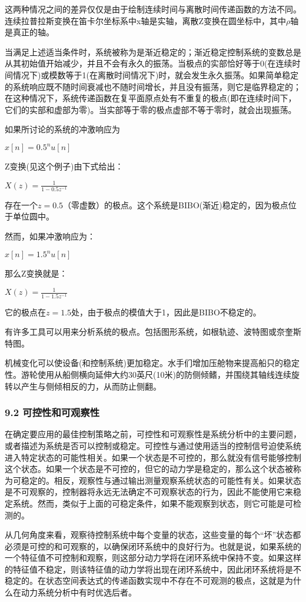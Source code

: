 这两种情况之间的差异仅仅是由于绘制连续时间与离散时间传递函数的方法不同。连续拉普拉斯变换在笛卡尔坐标系中x轴是实轴，离散Z变换在圆坐标中，其中$\rho
$轴是真正的轴。

当满足上述适当条件时，系统被称为是渐近稳定的；渐近稳定控制系统的变数总是从其初始值开始减少，并且不会有永久的振荡。当极点的实部恰好等于0(在连续时间情况下)或模数等于1(在离散时间情况下)时，就会发生永久振荡。如果简单稳定的系统响应既不随时间衰减也不随时间增长，并且没有振荡，则它是临界稳定的；在这种情况下，系统传递函数在复平面原点处有不重复的极点(即在连续时间下，它们的实部和虚部为零)。当实部等于零的极点虚部不等于零时，就会出现振荡。

如果所讨论的系统的冲激响应为

$x[n] = 0.5^n u[n]$

Z变换(见这个例子)由下式给出：

$X(z) = \frac{1}{1 - 0.5z^{-1}}$

存在一个$z = 0.5$（零虚数）的极点。这个系统是BIBO(渐近)稳定的，因为极点位于单位圆中。

然而，如果冲激响应为：

$x[n] = 1.5^n u[n]$

那么Z变换就是：

$ X(z) = \frac{1}{1 - 1.5z^{-1}} $

它的极点在$z = 1.5$处，由于极点的模值大于1，因此是BIBO不稳定的。

有许多工具可以用来分析系统的极点。包括图形系统，如根轨迹、波特图或奈奎斯特图。

机械变化可以使设备(和控制系统)更加稳定。水手们增加压舱物来提高船只的稳定性。游轮使用从船侧横向延伸大约30英尺(10米)的防侧倾鳍，并围绕其轴线连续旋转以产生与侧倾相反的力，从而防止侧翻。

\subsubsection{9.2 可控性和可观察性}

在确定要应用的最佳控制策略之前，可控性和可观察性是系统分析中的主要问题，或者描述为系统是否可以控制或稳定。可控性与通过使用适当的控制信号迫使系统进入特定状态的可能性相关。如果一个状态是不可控的，那么就没有信号能够控制这个状态。如果一个状态是不可控的，但它的动力学是稳定的，那么这个状态被称为可稳定的。相反，观察性与通过输出测量观察系统状态的可能性有关。如果状态是不可观察的，控制器将永远无法确定不可观察状态的行为，因此不能使用它来稳定系统。然而，类似于上面的可稳定条件，如果不能观察到状态，则它可能是可检测的。

从几何角度来看，观察待控制系统中每个变量的状态，这些变量的每个“坏”状态都必须是可控的和可观察的，以确保闭环系统中的良好行为。也就是说，如果系统的一个特征值不可控制和观察，则这部分动力学将在闭环系统中保持不变。如果这样的特征值不稳定，则该特征值的动力学将出现在闭环系统中，因此闭环系统将是不稳定的。在状态空间表达式的传递函数实现中不存在不可观测的极点，这就是为什么在动力系统分析中有时优选后者。

